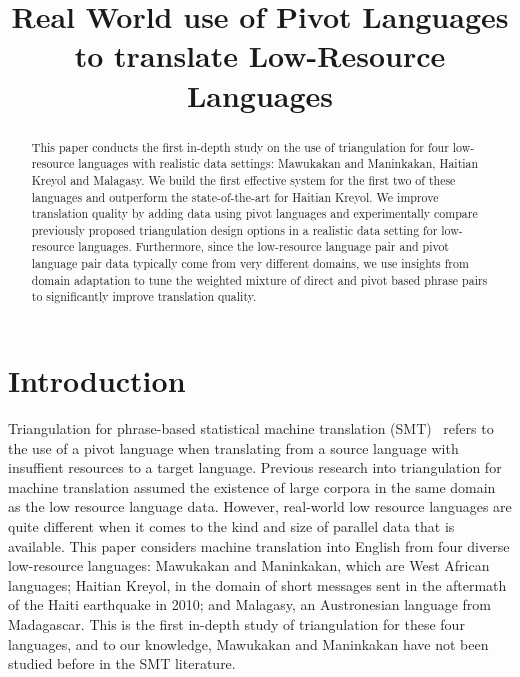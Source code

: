 \documentclass[11pt]{article}
\title{Real World use of Pivot Languages to translate Low-Resource Languages}
\author{}
\date{}
\begin{document}
\maketitle

\begin{abstract}
This paper conducts the first in-depth study on the use of triangulation for four low-resource languages with realistic data settings: Mawukakan and Maninkakan, Haitian Kreyol and Malagasy. We build the first effective system for the first two of these languages and outperform the state-of-the-art for Haitian Kreyol. We improve translation quality by adding data using pivot languages and experimentally compare previously proposed triangulation design options in a realistic data setting for low-resource languages. Furthermore, since the low-resource language pair and pivot language pair data typically come from very different domains, we use insights from domain adaptation to tune the weighted mixture of direct and pivot based phrase pairs to significantly improve translation quality.
\end{abstract}

\section{Introduction}
Triangulation for phrase-based statistical machine translation (SMT)~\cite{Utiyama:07,Cohn:07} refers to the use of a pivot language when translating from a source language with insuffient resources to a target language. Previous research into triangulation for machine translation assumed the existence of large corpora in the same domain as the low resource language data. However, real-world low resource languages are quite different when it comes to the kind and size of parallel data that is available. This paper considers machine translation into English from four diverse low-resource languages: Mawukakan and Maninkakan, which are West African languages;  Haitian Kreyol, in the domain of short messages sent in the aftermath of the Haiti earthquake in 2010; and Malagasy, an Austronesian language from Madagascar. This is the first in-depth study of triangulation for these four languages, and to our knowledge, Mawukakan and Maninkakan have not been studied before in the SMT literature.
\end{document}
